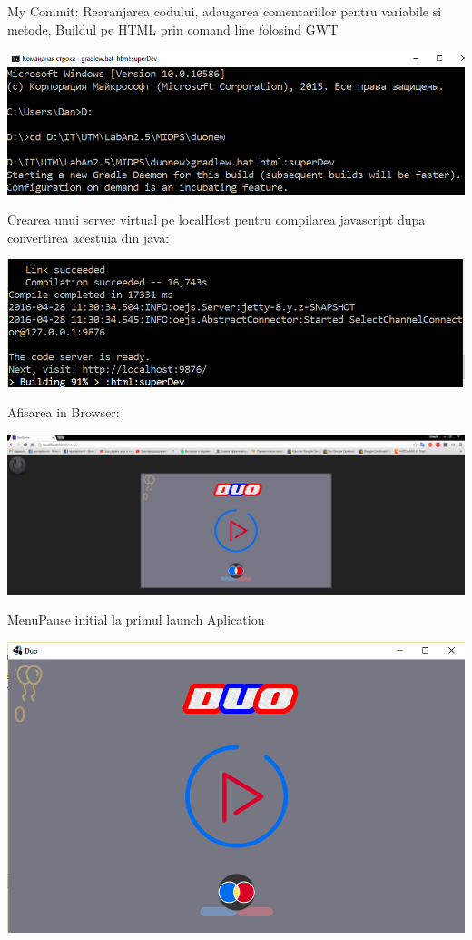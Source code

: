 \newline \newline
My Commit: Rearanjarea codului, adaugarea comentariilor pentru variabile si metode, Buildul pe HTML prin comand line folosind GWT
\begin{center}
\includegraphics[width=0.7\linewidth]{screenshot008}
\end{center}
Crearea unui server virtual pe localHost pentru compilarea javascript dupa convertirea acestuia din java:
\begin{center}
\includegraphics[width=0.7\linewidth]{screenshot009}
\end{center}
Afisarea in Browser:
\begin{center}
\includegraphics[width=0.7\linewidth]{screenshot010}
\end{center}

\newline \newline
MenuPause initial la primul launch Aplication
\begin{center}
\includegraphics[width=0.7\linewidth]{screenshot011}
\end{center}

